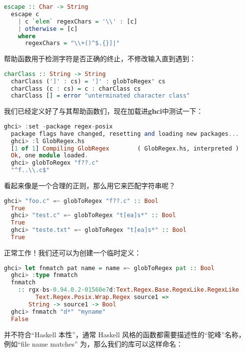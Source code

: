 \documentclass[./main.tex]{subfiles}
\begin{document}
\begin{lstlisting}[language=Haskell]
  escape :: Char -> String
  escape c
    | c `elem` regexChars = '\\' : [c]
    | otherwise = [c]
    where
      regexChars = "\\+()^$.{}]|"
\end{lstlisting}

帮助函数用于检测字符是否正确的终止，不修改输入直到遇到\acode{]}：

\begin{lstlisting}[language=Haskell]
  charClass :: String -> String
  charClass (']' : cs) = ']' : globToRegex' cs
  charClass (c : cs) = c : charClass cs
  charClass [] = error "unterminated character class"
\end{lstlisting}

我们已经定义好了与其帮助函数们，现在加载进\textbf{ghci}中测试一下：

\begin{lstlisting}[language=Haskell]
  ghci> :set -package regex-posix
  package flags have changed, resetting and loading new packages...
  ghci> :l GlobRegex.hs
  [1 of 1] Compiling GlobRegex        ( GlobRegex.hs, interpreted )
  Ok, one module loaded.
  ghci> globToRegex "f??.c"
  "^f..\\.c$"
\end{lstlisting}

看起来像是一个合理的正则，那么用它来匹配字符串呢？

\begin{lstlisting}[language=Haskell]
  ghci> "foo.c" =~ globToRegex "f??.c" :: Bool
  True
  ghci> "test.c" =~ globToRegex "t[ea]s*" :: Bool
  True
  ghci> "teste.txt" =~ globToRegex "t[ea]s*" :: Bool
  True
\end{lstlisting}

正常工作！我们还可以为创建一个临时定义：

\begin{lstlisting}[language=Haskell]
  ghci> let fnmatch pat name = name =~ globToRegex pat :: Bool
  ghci> :type fnmatch
  fnmatch
    :: rgx-bs-0.94.0.2-01560e7d:Text.Regex.Base.RegexLike.RegexLike
         Text.Regex.Posix.Wrap.Regex source1 =>
       String -> source1 -> Bool
  ghci> fnmatch "d*" "myname"
  False
\end{lstlisting}

并不符合“Haskell 本性”，通常 Haskell 风格的函数都需要描述性的“驼峰”名称，例如“file name matches”
为，那么我们的库可以这样命名：
\end{document}
